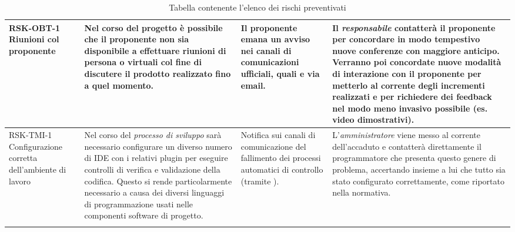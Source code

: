\begin{center}
\begin{longtable}{|p{3cm}|p{4cm}|p{3.5cm}|p{3.5cm}|}
		RSK-OBT-1 \newline Riunioni col proponente 
		& 
		Nel corso del progetto è possibile che il proponente non sia disponibile a effettuare riunioni di persona o virtuali col fine di discutere il prodotto realizzato fino a quel momento.
		&   
		Il proponente emana un avviso nei canali di comunicazioni ufficiali, quali \glock{Slack} e via email.
		& 
		Il \textit{responsabile} contatterà il proponente per concordare in modo tempestivo nuove conferenze con maggiore anticipo. Verranno poi concordate nuove modalità di interazione con il proponente per metterlo al corrente degli incrementi realizzati e per richiedere dei feedback nel modo meno invasivo possibile (es. video dimostrativi). \\
		\hline
		RSK-TMI-1 \newline Configurazione corretta dell'ambiente di lavoro  
		& 
		Nel corso del \textit{processo di sviluppo}
		sarà necessario configurare un diverso numero di IDE con
		i relativi plugin per eseguire controlli di verifica e validazione della codifica.
		Questo si rende particolarmente necessario a causa dei diversi linguaggi di programmazione 
		usati nelle componenti software di progetto.
		&  
		Notifica sui canali di comunicazione del fallimento dei processi automatici di controllo (tramite \glock{Github Actions}).
		& 
		L'\textit{amministratore} viene messo al corrente dell'accaduto e contatterà direttamente il programmatore che presenta questo genere
		di problema, accertando insieme a lui che tutto sia stato configurato correttamente, come riportato nella normativa.  \\
		\hline
	
		\caption{Tabella contenente l'elenco dei rischi preventivati}
	\end{longtable}

\end{center}
